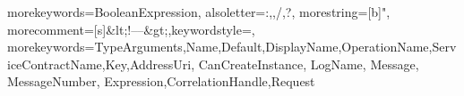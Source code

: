  {
    morekeywords={BooleanExpression},
    alsoletter={:,,/,?},
    morestring=[b]{"},
    morecomment=[s]{&lt;!--}{--&gt;},keywordstyle=\color{forestGreen},
    morekeywords={TypeArguments,Name,Default,DisplayName,OperationName,ServiceContractName,Key,AddressUri,
CanCreateInstance, LogName, Message, MessageNumber, Expression,CorrelationHandle,Request}
}

\newcommand{\XAML}[3]{
    \kodeprintstyle{#1}{#2}{#3}{xaml}
}